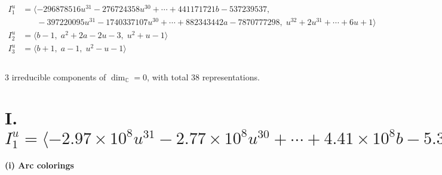\documentclass[1p]{elsarticle_modified}
\theoremstyle{definition}
\begin{document}
\begin{align*}
I^u_{1}&=\langle 
-296878516 u^{31}-276724358 u^{30}+\cdots+441171721 b-537239537,\\
\phantom{I^u_{1}}&\phantom{= \langle  }-397220095 u^{31}-1740337107 u^{30}+\cdots+882343442 a-7870777298,\;u^{32}+2 u^{31}+\cdots+6 u+1\rangle \\
I^u_{2}&=\langle 
b-1,\;a^2+2 a-2 u-3,\;u^2+u-1\rangle \\
I^u_{3}&=\langle 
b+1,\;a-1,\;u^2- u-1\rangle \\
\\
\end{align*}
\raggedright * 3 irreducible components of $\dim_{\mathbb{C}}=0$, with total 38 representations.\\
\newpage
\renewcommand{\arraystretch}{1}
\centering \section*{I. $I^u_{1}= \langle -2.97\times10^{8} u^{31}-2.77\times10^{8} u^{30}+\cdots+4.41\times10^{8} b-5.37\times10^{8},\;-3.97\times10^{8} u^{31}-1.74\times10^{9} u^{30}+\cdots+8.82\times10^{8} a-7.87\times10^{9},\;u^{32}+2 u^{31}+\cdots+6 u+1 \rangle$}
\flushleft \textbf{(i) Arc colorings}\\
\end{document}
